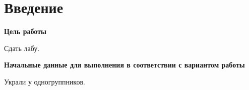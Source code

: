 \section{Введение}

\textbf{Цель работы}

Сдать лабу.

\textbf{Начальные данные для выполнения в соответствии с вариантом работы}

Украли у одногруппников. 
